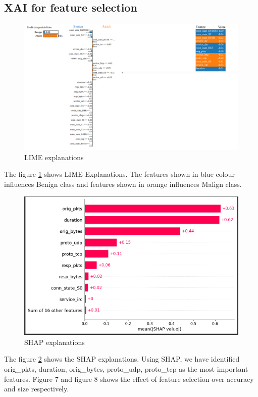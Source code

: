 \documentclass[conference,letterpaper]{IEEEtran}
\begin{document}
\subsection{XAI for feature selection}
\begin{figure}[H]
    \centering
    \includegraphics[width=\linewidth]{lime-result-1.png}
    \caption{LIME explanations}
    \label{fig:lime_res}
\end{figure}
The figure \ref{fig:lime_res} shows LIME Explanations. The features shown in blue colour influences Benign class and features shown in orange influences Malign class. 

\begin{figure}[h]
    \centering
    \includegraphics[width=\linewidth]{shap-result-2.png}
    \caption{SHAP explanations}
    \label{fig:shap_result}
\end{figure}
The figure \ref{fig:shap_result} shows the SHAP explanations. Using SHAP, we have identified orig\_pkts, duration, orig\_bytes, proto\_udp, proto\_tcp as the most important features. Figure 7 and figure 8 shows the effect of feature selection over accuracy and size respectively. 
\end{document}
